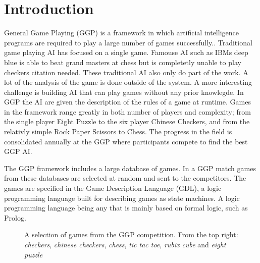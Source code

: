 
\chapter{Introduction}
General Game Playing (GGP) is a framework in which artificial intelligence programs are required to play a large number of games successfully.\cite{Genesereth/GGPOverview}. Traditional game playing AI has focused on a single game. Famouse AI such as IBMs deep blue is able to beat grand masters at chess but is completetly unable to play checkers \ac{citation needed}. These traditional AI also only do part of the work. A lot of the analysis of the game is done outside of the system. A more interesting challenge is building AI that can play games without any prior knowlegde. In GGP the AI are given the description of the rules of a game at runtime. Games in the framework range greatly in both number of players and complexity; from the single player Eight Puzzle to the six player Chinese Checkers, and from the relativly simple Rock Paper Scissors to Chess\cite{GGP-Website}. The progress in the field is consolidated annually at the GGP where participants compete to find the best GGP AI.

The GGP framework includes a large database of games. In a GGP match games from these databases are selected at random and sent to the competitors. The games are specified in the Game Description Language (GDL), a logic programming language built for describing games as state machines\cite{GDL_Spec}. A logic programming language being any that is mainly based on formal logic, such as Prolog.


\begin{figure}[ht]
	\centering
	\caption{A selection of games from the GGP competition. From the top right: \textit{checkers}, \textit{chinese checkers}, \textit{chess}, \textit{tic tac toe}, \textit{rubix cube} and \textit{eight puzzle}}
\end{figure}

